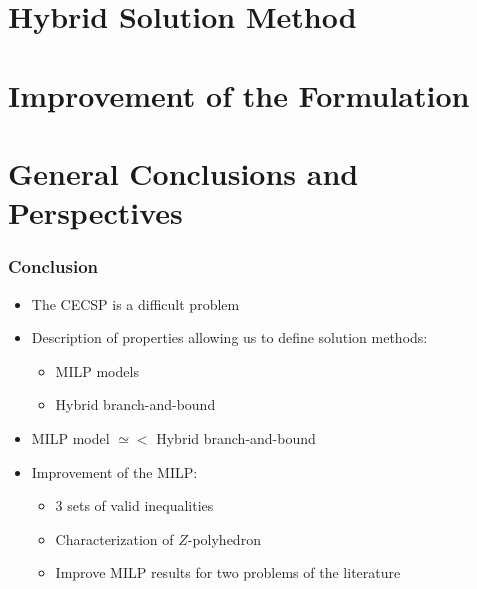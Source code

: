 \documentclass{beamer}
\begin{document}
\section{Hybrid Solution Method}


\section{Improvement of the Formulation}



\section{General Conclusions and Perspectives}

\begin{frame}
  \frametitle{Conclusion}
  \vfill
  \begin{itemize}
  \item The CECSP is a difficult problem
    \vfill
\pause
  \item Description of properties allowing us to define solution
    methods:
    \begin{itemize}
    \item MILP models
    \item  Hybrid branch-and-bound 
    \end{itemize}
\pause
    \vfill 
  \item MILP model $\simeq<$ Hybrid branch-and-bound
    \vfill 
\pause
  \item Improvement of the MILP:
    \begin{itemize}
    \item 3 sets of valid inequalities
    \item Characterization of $Z$-polyhedron
    \item Improve MILP results for two problems of the literature 
    \end{itemize}
  \end{itemize}
\vfill
\pause
\end{frame}
\end{document}
